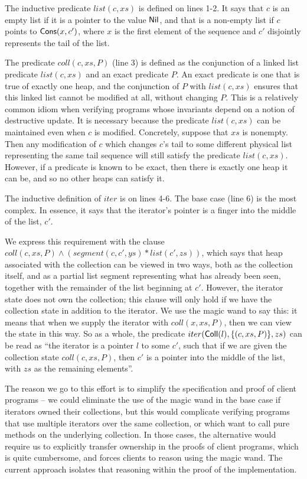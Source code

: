 \documentclass[preprint,natbib]{sigplanconf}
\begin{document}
The inductive predicate $list(c, xs)$ is defined on lines 1-2. It says
that $c$ is an empty list if it is a pointer to the value
$\mbox{\textsf{{Nil}}}$, and that is a non-empty list if $c$ points to
$\mbox{\textsf{{Cons}}}(x, c')$, where $x$ is the first element of the sequence
and $c'$ disjointly represents the tail of the list.

The predicate $coll(c, xs, P)$ (line 3) is defined as the conjunction
of a linked list predicate $list(c, xs)$ and an exact predicate
$P$. An exact predicate is one that is true of exactly one heap, and
the conjunction of $P$ with $list(c,xs)$ ensures that this linked list
cannot be modified at all, without changing $P$. This is a relatively
common idiom when verifying programs whose invariants depend on a
notion of destructive update. It is necessary because the predicate
$list(c, xs)$ can be maintained even when $c$ is modified. Concretely,
suppose that $xs$ is nonempty. Then any modification of $c$ which
changes $c$'s tail to some different physical list representing the
same tail sequence will still satisfy the predicate $list(c, xs)$.
However, if a predicate is known to be exact, then there is exactly
one heap it can be, and so no other heaps can satisfy it. 

The inductive definition of $iter$ is on lines 4-6. The base case
(line 6) is the most complex. In essence, it says that the iterator's
pointer is a finger into the middle of the list, $c'$.  

We express this requirement with the clause $coll(c, xs, P) \land
(segment(c,c',ys) * list(c',zs))$, which says that heap associated
with the collection can be viewed in two ways, both as the collection
itself, and as a partial list segment representing what has already
been seen, together with the remainder of the list beginning at $c'$.
%
However, the iterator state does not own the collection; this clause
will only hold if we have the collection state in addition to the
iterator. We use the magic wand to say this: it means that when we
supply the iterator with $coll(x, xs, P)$, then we can view the
state in this way.
So as a whole, the predicate $iter(\mbox{\textsf{{Coll}}}(l), \{{(c,xs,P)}\},
zs)$ can be read as ``the iterator is a pointer $l$ to some $c'$, such
that if we are given the collection state $coll(c, xs, P)$, then $c'$
is a pointer into the middle of the list, with $zs$ as the remaining
elements''. 

The reason we go to this effort is to simplify the specification and
proof of client programs -- we could eliminate the use of the magic
wand in the base case if iterators owned their collections, but this
would complicate verifying programs that use multiple iterators over
the same collection, or which want to call pure methods on the
underlying collection. In those cases, the alternative would require
us to explicitly transfer ownership in the proofs of client programs,
which is quite cumbersome, and forces clients to reason using the 
magic wand. The current approach isolates that reasoning within the 
proof of the implementation. 
\end{document}
